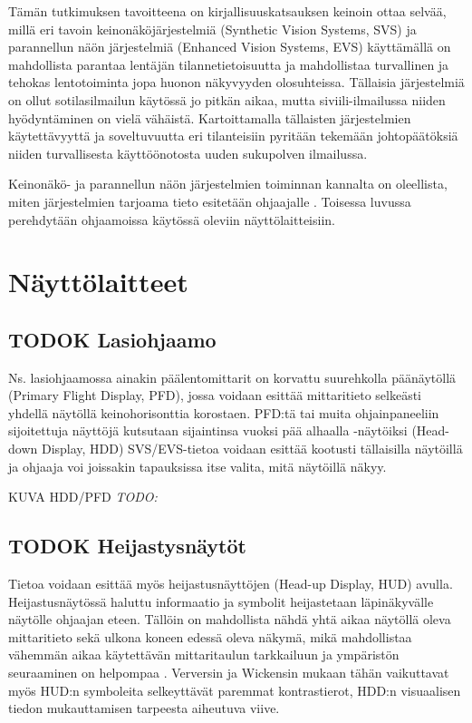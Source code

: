 \documentclass[utf8,bachelor,manualbib]{gradu3}
\begin{document}
Tämän tutkimuksen tavoitteena on kirjallisuuskatsauksen keinoin ottaa selvää, millä eri tavoin keinonäköjärjestelmiä (Synthetic Vision Systems, SVS) ja parannellun näön järjestelmiä (Enhanced Vision Systems, EVS) käyttämällä on mahdollista parantaa lentäjän tilannetietoisuutta ja mahdollistaa turvallinen ja tehokas lentotoiminta jopa huonon näkyvyyden olosuhteissa. Tällaisia järjestelmiä on ollut sotilasilmailun käytössä jo pitkän aikaa, mutta siviili-ilmailussa niiden hyödyntäminen on vielä vähäistä. Kartoittamalla tällaisten järjestelmien käytettävyyttä ja soveltuvuutta eri tilanteisiin pyritään tekemään johtopäätöksiä niiden turvallisesta käyttöönotosta uuden sukupolven ilmailussa.

Keinonäkö- ja parannellun näön järjestelmien toiminnan kannalta on oleellista, miten järjestelmien tarjoama tieto esitetään ohjaajalle \citep{kimkaber2014}. Toisessa luvussa perehdytään ohjaamoissa käytössä oleviin näyttölaitteisiin. 

\chapter{Näyttölaitteet}

\section{TODOK Lasiohjaamo}

Ns. lasiohjaamossa ainakin päälentomittarit on korvattu suurehkolla päänäytöllä (Primary Flight Display, PFD), jossa voidaan esittää mittaritieto selkeästi yhdellä näytöllä keinohorisonttia korostaen. PFD:tä tai muita ohjainpaneeliin sijoitettuja näyttöjä kutsutaan sijaintinsa vuoksi pää alhaalla -näytöiksi (Head-down Display, HDD) SVS/EVS-tietoa voidaan esittää kootusti tällaisilla näytöillä ja ohjaaja voi joissakin tapauksissa itse valita, mitä näytöillä näkyy.

KUVA HDD/PFD \emph{TODO:}

\section{TODOK Heijastysnäytöt}

Tietoa voidaan esittää myös heijastusnäyttöjen (Head-up Display, HUD) avulla. Heijastusnäytössä haluttu informaatio ja symbolit heijastetaan läpinäkyvälle näytölle ohjaajan eteen. Tällöin on mahdollista nähdä yhtä aikaa näytöllä oleva mittaritieto sekä ulkona koneen edessä oleva näkymä, mikä mahdollistaa vähemmän aikaa käytettävän mittaritaulun tarkkailuun ja ympäristön seuraaminen on helpompaa \citep{crawfordneal2006}. Verversin ja Wickensin \citeyearpar{ververswickens1998} mukaan tähän vaikuttavat myös HUD:n symboleita selkeyttävät paremmat kontrastierot, HDD:n visuaalisen tiedon mukauttamisen tarpeesta aiheutuva viive.
\end{document}
